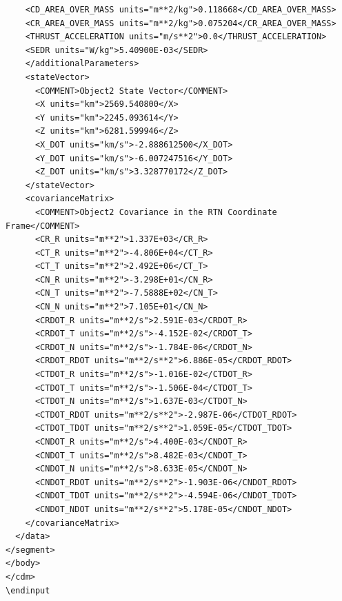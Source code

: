 \begin{lstlisting}
    <CD_AREA_OVER_MASS units="m**2/kg">0.118668</CD_AREA_OVER_MASS>
    <CR_AREA_OVER_MASS units="m**2/kg">0.075204</CR_AREA_OVER_MASS>
    <THRUST_ACCELERATION units="m/s**2">0.0</THRUST_ACCELERATION>
    <SEDR units="W/kg">5.40900E-03</SEDR>
    </additionalParameters>
    <stateVector>
      <COMMENT>Object2 State Vector</COMMENT>
      <X units="km">2569.540800</X>
      <Y units="km">2245.093614</Y>
      <Z units="km">6281.599946</Z>
      <X_DOT units="km/s">-2.888612500</X_DOT>
      <Y_DOT units="km/s">-6.007247516</Y_DOT>
      <Z_DOT units="km/s">3.328770172</Z_DOT>
    </stateVector>
    <covarianceMatrix>
      <COMMENT>Object2 Covariance in the RTN Coordinate Frame</COMMENT>
      <CR_R units="m**2">1.337E+03</CR_R>
      <CT_R units="m**2">-4.806E+04</CT_R>
      <CT_T units="m**2">2.492E+06</CT_T>
      <CN_R units="m**2">-3.298E+01</CN_R>
      <CN_T units="m**2">-7.5888E+02</CN_T>
      <CN_N units="m**2">7.105E+01</CN_N>
      <CRDOT_R units="m**2/s">2.591E-03</CRDOT_R>
      <CRDOT_T units="m**2/s">-4.152E-02</CRDOT_T>
      <CRDOT_N units="m**2/s">-1.784E-06</CRDOT_N>
      <CRDOT_RDOT units="m**2/s**2">6.886E-05</CRDOT_RDOT>
      <CTDOT_R units="m**2/s">-1.016E-02</CTDOT_R>
      <CTDOT_T units="m**2/s">-1.506E-04</CTDOT_T>
      <CTDOT_N units="m**2/s">1.637E-03</CTDOT_N>
      <CTDOT_RDOT units="m**2/s**2">-2.987E-06</CTDOT_RDOT>
      <CTDOT_TDOT units="m**2/s**2">1.059E-05</CTDOT_TDOT>
      <CNDOT_R units="m**2/s">4.400E-03</CNDOT_R>
      <CNDOT_T units="m**2/s">8.482E-03</CNDOT_T>
      <CNDOT_N units="m**2/s">8.633E-05</CNDOT_N>
      <CNDOT_RDOT units="m**2/s**2">-1.903E-06</CNDOT_RDOT>
      <CNDOT_TDOT units="m**2/s**2">-4.594E-06</CNDOT_TDOT>
      <CNDOT_NDOT units="m**2/s**2">5.178E-05</CNDOT_NDOT>
    </covarianceMatrix>
  </data>
</segment>
</body>
</cdm>
\endinput
\end{lstlisting}

